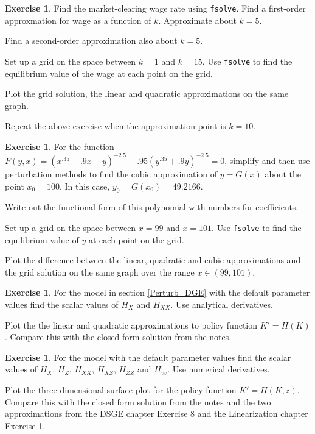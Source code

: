 \documentclass[letterpaper,12pt]{article}
\theoremstyle{definition}
\newtheorem{exercise}[theorem]{Exercise}
\begin{document}
\begin{spacing}{1.5}
\begin{exercise}
		Find the market-clearing wage rate using {\tt fsolve}.  Find a first-order approxmation for wage as a function of $k$.  Approximate about $k=5$.  

		Find a second-order approximation also about $k=5$.

		Set up a grid on the space between $k=1$ and $k=15$. Use {\tt fsolve} to find the equilibrium value of the wage at each point on the grid.

		Plot the grid solution, the linear and quadratic approximations on the same graph.

		Repeat the above exercise when the approximation point is $k=10$.
	\end{exercise}

	\begin{exercise} \label{Perturb_HW_Bivar_Grid}
		For the function $F(y,x) =(x^{.35} + .9x - y)^{-2.5} - .95(y^{.35} + .9y )^{-2.5} = 0$, simplify and then use perturbation methods to find the cubic approximation of $y=G(x)$ about the point $x_0=100$.  In this case, $y_0=G(x_0)=49.2166$.

		Write out the functional form of this polynomial with numbers for coefficients.

		Set up a grid on the space between $x=99$ and $x=101$. Use {\tt fsolve} to find the equilibrium value of $y$ at each point on the grid.

		Plot the difference between the linear, quadratic and cubic approximations and the grid solution on the same graph over the range $x\in(99,101)$.
	\end{exercise}

	\begin{exercise} \label{Perturb_HW_BM_NoStoch}
		For the \citet{BrockMirman1972} model in section \ref{Perturb_DGE} with the default parameter values find the scalar values of $H_X$ and $H_{XX}$.  Use analytical derivatives.

		Plot the the linear and quadratic approximations to policy function $K' = H(K)$.  Compare this with the closed form solution from the notes.
	\end{exercise}

	\begin{exercise} \label{Perturb_HW_BM}
		For the \citet{BrockMirman1972} model with the default parameter values find the scalar values of $H_X$, $H_Z$, $H_{XX}$, $H_{XZ}$, $H_{ZZ}$ and $H_{vv}$.  Use numerical derivatives.

		Plot the three-dimensional surface plot for the policy function $K' = H(K,z)$.  Compare this with the closed form solution from the notes and the two approximations from the DSGE chapter Exercise 8 and the Linearization chapter Exercise 1.
	\end{exercise}


\end{spacing}
\end{document}
